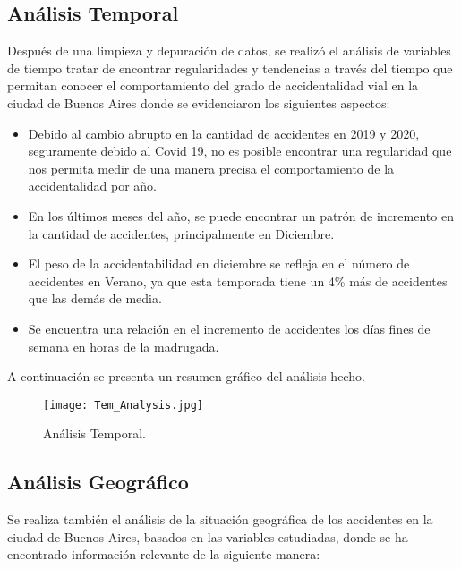 \documentclass[12pt]{article}
\begin{document}
\subsection{Análisis Temporal}
Después de una limpieza y depuración de datos, se realizó el análisis de variables de tiempo tratar de encontrar regularidades y tendencias a través del tiempo que permitan conocer el comportamiento del grado de accidentalidad vial en la ciudad de Buenos Aires donde se evidenciaron los siguientes aspectos:
\begin{itemize}
    \item Debido al cambio abrupto en la cantidad de accidentes en 2019 y 2020, seguramente debido al Covid 19, no es posible encontrar una regularidad que nos permita medir de una manera precisa el comportamiento de la accidentalidad por año.

    \item En los últimos meses del año, se puede encontrar un patrón de incremento en la cantidad de accidentes, principalmente en Diciembre. 

    \item El peso de la accidentabilidad en diciembre se refleja en el número de accidentes en Verano, ya que esta temporada tiene un 4\% más de accidentes que las demás de media.
    
    \item Se encuentra una relación en el incremento de accidentes los días fines de semana en horas de la madrugada.
\end{itemize}

A continuación se presenta un resumen gráfico del análisis hecho. 

\begin{figure}[H]
  \centering
  \texttt{[image: Tem\_Analysis.jpg]}
  \caption{Análisis Temporal.}
  \label{fig:tem-analysis}
\end{figure}

\subsection{Análisis Geográfico}
Se realiza también el análisis de la situación geográfica de los accidentes en la ciudad de Buenos Aires, basados en las variables estudiadas, donde se ha encontrado información relevante de la siguiente manera:
\end{document}
